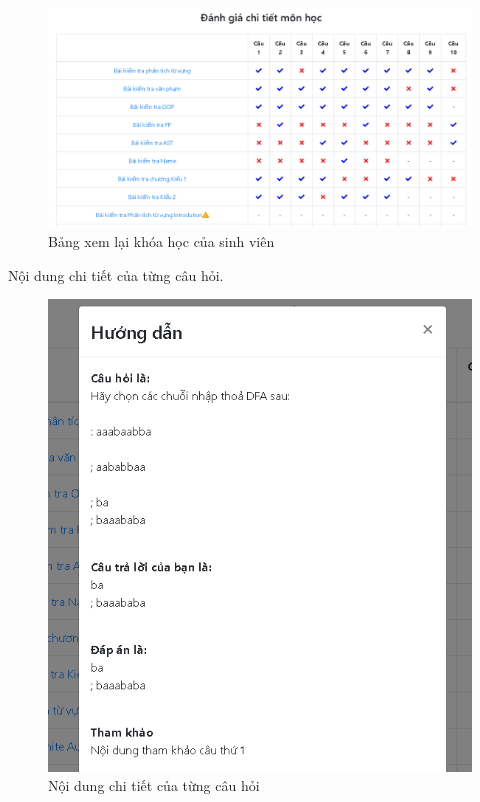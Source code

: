\begin{center}
	\begin{figure}[htp]
		\begin{center}
			\includegraphics[width=1\linewidth]{img/33}
		\end{center}
		\caption{Bảng xem lại khóa học của sinh viên}
		\label{refhinh65}
	\end{figure}
\end{center}

Nội dung chi tiết của từng câu hỏi.

\begin{center}
	\begin{figure}[htp]
		\begin{center}
			\includegraphics[width=0.5\linewidth]{img/34}
		\end{center}
		\caption{Nội dung chi tiết của từng câu hỏi}
		\label{refhinh66}
	\end{figure}
\end{center}